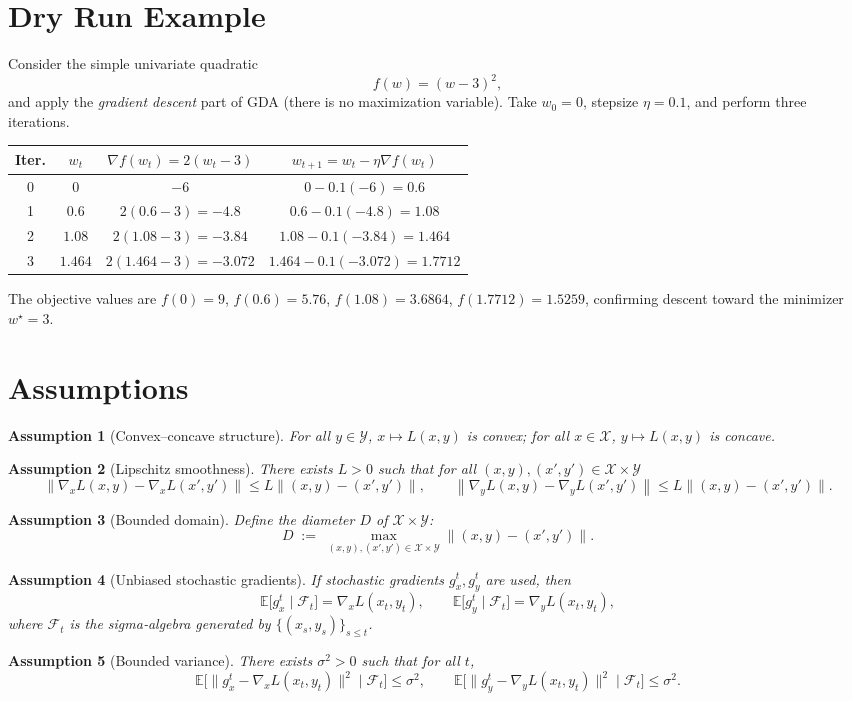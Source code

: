 \documentclass{article}
\newtheorem{assumption}{Assumption}
\newcommand{\E}{\mathbb{E}}
\newcommand{\norm}[1]{\left\|#1\right\|}
\begin{document}
\section*{Dry Run Example}
Consider the simple univariate quadratic 
\[
f(w)= (w-3)^{2},
\]
and apply the \emph{gradient descent} part of GDA (there is no maximization variable).  
Take $w_{0}=0$, stepsize $\eta=0.1$, and perform three iterations.

\begin{center}
\begin{tabular}{c|c|c|c}
\textbf{Iter.} & $w_{t}$ & $\nabla f(w_{t})=2(w_{t}-3)$ & $w_{t+1}=w_{t}-\eta\nabla f(w_{t})$ \\ \hline
0 & $0$ & $-6$ & $0-0.1(-6)=0.6$ \\
1 & $0.6$ & $2(0.6-3)=-4.8$ & $0.6-0.1(-4.8)=1.08$ \\
2 & $1.08$ & $2(1.08-3)=-3.84$ & $1.08-0.1(-3.84)=1.464$ \\
3 & $1.464$ & $2(1.464-3)=-3.072$ & $1.464-0.1(-3.072)=1.7712$
\end{tabular}
\end{center}
The objective values are $f(0)=9$, $f(0.6)=5.76$, $f(1.08)=3.6864$, $f(1.7712)=1.5259$, confirming descent toward the minimizer $w^{\star}=3$.

\section*{Assumptions}
\begin{assumption}[Convex–concave structure] \label{as:convexconcave}
For all $y\in\mathcal{Y}$, $x\mapsto L(x,y)$ is convex; for all $x\in\mathcal{X}$, $y\mapsto L(x,y)$ is concave.
\end{assumption}
\begin{assumption}[Lipschitz smoothness] \label{as:smooth}
There exists $L>0$ such that for all $(x,y),(x',y')\in\mathcal{X}\times\mathcal{Y}$
\[
\norm{\nabla_{x}L(x,y)-\nabla_{x}L(x',y')}\le L\norm{(x,y)-(x',y')},
\qquad
\norm{\nabla_{y}L(x,y)-\nabla_{y}L(x',y')}\le L\norm{(x,y)-(x',y')}.
\]
\end{assumption}
\begin{assumption}[Bounded domain] \label{as:bounded}
Define the diameter $D$ of $\mathcal{X}\times\mathcal{Y}$:
\[
D \;:=\; \max_{(x,y),(x',y')\in\mathcal{X}\times\mathcal{Y}} \norm{(x,y)-(x',y')}.
\]
\end{assumption}
\begin{assumption}[Unbiased stochastic gradients] \label{as:unbiased}
If stochastic gradients $g_{x}^{t},g_{y}^{t}$ are used, then
\[
\E\bigl[g_{x}^{t}\mid \mathcal{F}_{t}\bigr]=\nabla_{x}L(x_{t},y_{t}),\qquad
\E\bigl[g_{y}^{t}\mid \mathcal{F}_{t}\bigr]=\nabla_{y}L(x_{t},y_{t}),
\]
where $\mathcal{F}_{t}$ is the sigma‑algebra generated by $\{(x_{s},y_{s})\}_{s\le t}$.
\end{assumption}
\begin{assumption}[Bounded variance] \label{as:variance}
There exists $\sigma^{2}>0$ such that for all $t$,
\[
\E\bigl[\|g_{x}^{t}-\nabla_{x}L(x_{t},y_{t})\|^{2}\mid\mathcal{F}_{t}\bigr]\le\sigma^{2},
\qquad
\E\bigl[\|g_{y}^{t}-\nabla_{y}L(x_{t},y_{t})\|^{2}\mid\mathcal{F}_{t}\bigr]\le\sigma^{2}.
\]
\end{assumption}
\end{document}
